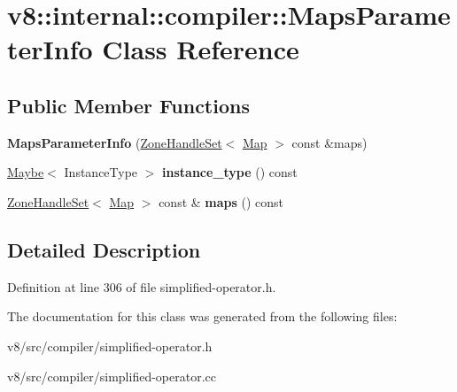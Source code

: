 \hypertarget{classv8_1_1internal_1_1compiler_1_1MapsParameterInfo}{}\section{v8\+:\+:internal\+:\+:compiler\+:\+:Maps\+Parameter\+Info Class Reference}
\label{classv8_1_1internal_1_1compiler_1_1MapsParameterInfo}
\subsection*{Public Member Functions}
\begin{DoxyCompactItemize}
\item 
\mbox{\label{classv8_1_1internal_1_1compiler_1_1MapsParameterInfo_aea3a7dc333b636cc18146318789408dc}} 
{\bfseries Maps\+Parameter\+Info} (\mbox{\hyperlink{classv8_1_1internal_1_1ZoneHandleSet}{Zone\+Handle\+Set}}$<$ \mbox{\hyperlink{classv8_1_1internal_1_1Map}{Map}} $>$ const \&maps)
\item 
\mbox{\label{classv8_1_1internal_1_1compiler_1_1MapsParameterInfo_ac7ca76c5609a142a06d9a30dc285a70d}} 
\mbox{\hyperlink{classv8_1_1Maybe}{Maybe}}$<$ Instance\+Type $>$ {\bfseries instance\+\_\+type} () const
\item 
\mbox{\label{classv8_1_1internal_1_1compiler_1_1MapsParameterInfo_a384e2bf8a20f22ee9f3fb128be0e7476}} 
\mbox{\hyperlink{classv8_1_1internal_1_1ZoneHandleSet}{Zone\+Handle\+Set}}$<$ \mbox{\hyperlink{classv8_1_1internal_1_1Map}{Map}} $>$ const  \& {\bfseries maps} () const
\end{DoxyCompactItemize}


\subsection{Detailed Description}


Definition at line 306 of file simplified-\/operator.\+h.



The documentation for this class was generated from the following files\+:\begin{DoxyCompactItemize}
\item 
v8/src/compiler/simplified-\/operator.\+h\item 
v8/src/compiler/simplified-\/operator.\+cc\end{DoxyCompactItemize}

